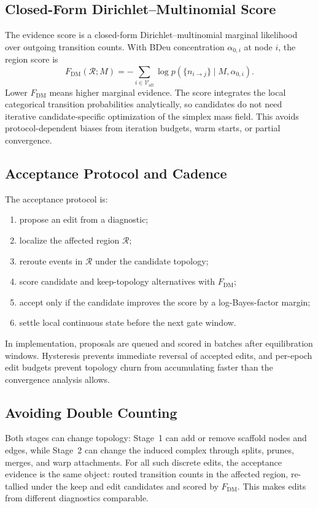 \documentclass[11pt]{article}
\theoremstyle{definition}
\theoremstyle{plain}
\begin{document}
\subsection{Closed-Form Dirichlet--Multinomial Score}
The evidence score is a closed-form Dirichlet--multinomial marginal likelihood over outgoing transition counts. With BDeu concentration $\alpha_{0,i}$ at node $i$, the region score is
\[
F_{\mathrm{DM}}(\mathcal R;M)
=-\sum_{i\in\mathcal V_{\mathrm{aff}}}
\log p\!\left(\{n_{i\to j}\}\mid M,\alpha_{0,i}\right).
\]
Lower $F_{\mathrm{DM}}$ means higher marginal evidence. The score integrates the local categorical transition probabilities analytically, so candidates do not need iterative candidate-specific optimization of the simplex mass field. This avoids protocol-dependent biases from iteration budgets, warm starts, or partial convergence.

\subsection{Acceptance Protocol and Cadence}
The acceptance protocol is:
\begin{enumerate}[leftmargin=1.5em]
  \item propose an edit from a diagnostic;
  \item localize the affected region $\mathcal R$;
  \item reroute events in $\mathcal R$ under the candidate topology;
  \item score candidate and keep-topology alternatives with $F_{\mathrm{DM}}$;
  \item accept only if the candidate improves the score by a log-Bayes-factor margin;
  \item settle local continuous state before the next gate window.
\end{enumerate}
In implementation, proposals are queued and scored in batches after equilibration windows. Hysteresis prevents immediate reversal of accepted edits, and per-epoch edit budgets prevent topology churn from accumulating faster than the convergence analysis allows.

\subsection{Avoiding Double Counting}
Both stages can change topology: Stage~1 can add or remove scaffold nodes and edges, while Stage~2 can change the induced complex through splits, prunes, merges, and warp attachments. For all such discrete edits, the acceptance evidence is the same object: routed transition counts in the affected region, re-tallied under the keep and edit candidates and scored by $F_{\mathrm{DM}}$. This makes edits from different diagnostics comparable.
\end{document}

